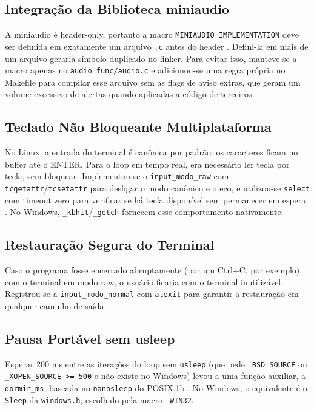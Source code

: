 \documentclass[
    12pt
    ,oneside
    ,a4paper
    ,chapter=TITLE
    ,section=TITLE
    ,sumario=abnt-6027-2012]{abntex2}
\begin{document}
\subsection{Integração da Biblioteca miniaudio}

A miniaudio é header-only, portanto a macro \texttt{MINIAUDIO\_IMPLEMENTATION} deve ser definida em exatamente um arquivo \texttt{.c} antes do header \cite{reid2024miniaudio}. Defini-la em mais de um arquivo geraria símbolo duplicado no linker. Para evitar isso, manteve-se a macro apenas no \texttt{audio\_func/audio.c} e adicionou-se uma regra própria no Makefile para compilar esse arquivo sem as flags de aviso extras, que geram um volume excessivo de alertas quando aplicadas a código de terceiros.

\subsection{Teclado Não Bloqueante Multiplataforma}

No Linux, a entrada do terminal é canônica por padrão: os caracteres ficam no buffer até o ENTER. Para o loop em tempo real, era necessário ler tecla por tecla, sem bloquear. Implementou-se o \texttt{input\_modo\_raw} com \texttt{tcgetattr}/\texttt{tcsetattr} para desligar o modo canônico e o eco, e utilizou-se \texttt{select} com timeout zero para verificar se há tecla disponível sem permanecer em espera \cite{manpages_linux}. No Windows, \texttt{\_kbhit}/\texttt{\_getch} fornecem esse comportamento nativamente.

\subsection{Restauração Segura do Terminal}

Caso o programa fosse encerrado abruptamente (por um Ctrl+C, por exemplo) com o terminal em modo raw, o usuário ficaria com o terminal inutilizável. Registrou-se a \texttt{input\_modo\_normal} com \texttt{atexit} para garantir a restauração em qualquer caminho de saída.

\subsection{Pausa Portável sem usleep}

Esperar 200 ms entre as iterações do loop sem \texttt{usleep} (que pede \texttt{\_BSD\_SOURCE} ou \texttt{\_XOPEN\_SOURCE >= 500} e não existe no Windows) levou a uma função auxiliar, a \texttt{dormir\_ms}, baseada no \texttt{nanosleep} do POSIX.1b \cite{manpages_linux}. No Windows, o equivalente é o \texttt{Sleep} da \texttt{windows.h}, escolhido pela macro \texttt{\_WIN32}.
\end{document}
